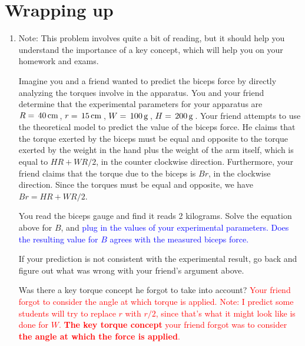 \documentclass[11pt,letterpaper]{article}
\newcommand{\question}[2][blue]{\textcolor{#1}{#2}}
\newcommand{\answer}[2][red]{\textcolor{#1}{#2}}
\begin{document}
\section*{Wrapping up}
\begin{enumerate}[labproc]
	\item 
		Note:  This problem involves quite a bit of reading,
		but it should help you understand the importance of a key
		concept, which will help you on your homework and exams.

		Imagine you and a friend wanted to predict the biceps force by 
		directly analyzing the torques involve in the apparatus.
		You and your friend determine that the experimental parameters for
		your apparatus are 
		$R=\, 40 \,\mathrm{ cm }\,$, $r=\, 15 \,\mathrm{ cm }\,$,
		$W=\, 100 \,\mathrm{ g }\,$, $H=\, 200 \,\mathrm{ g }\,$.
		Your friend attempts to use the theoretical model
		to predict the value of the biceps force.
		He claims that the torque exerted by the biceps must be equal and 
		opposite to the torque exerted by the weight in the hand
		plus the weight of the arm itself, 
		which is equal to $H R + W R/2$, in the counter clockwise direction.
		Furthermore, your friend claims that the torque due to
		the biceps is $B r$, in the clockwise direction.
		Since the torques must be equal and opposite, we have
		$Br=HR+WR/2$.

		You read the biceps gauge and find it reads 2 kilograms.
		Solve the equation above for $B$, and 
		\question{plug in the values of your experimental parameters.
		Does the resulting value for $B$ agrees 
		with the measured biceps force.}

		If your prediction is not consistent with the experimental result, 
		go back and figure out what was wrong with your friend's argument
		above.  

		Was there a key torque concept he forgot to take into account?
		\answer{Your friend forgot to consider the angle at which torque is
			applied.  Note:  I predict some students will try to replace $r$
		with $r/2$, since that's what it might look like is done for $W$.
		{\bf The key torque concept} your friend forgot was to consider 
		{\bf the angle at which the force is applied}.  
		}


\end{enumerate}
\end{document}
